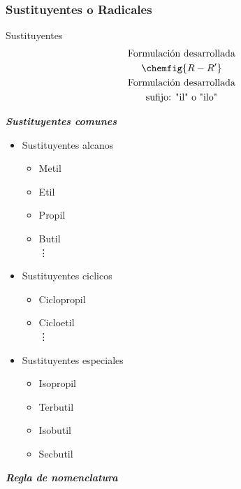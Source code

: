\subsubsection*{Sustituyentes o Radicales}
\begin{Theorem*} {Sustituyentes}
	\begin{gather*}
		\text{Formulación desarrollada} \\
		\chemfig{R-R'} \\
		\text{Formulación desarrollada} \\
		\text{sufijo: "il" o "ilo"}
	\end{gather*}
\end{Theorem*}
\noindent \textbf{\textit{Sustituyentes comunes}}
\begin{itemize}
	\item Sustituyentes alcanos
	\begin{itemize}
		\item Metil \quad {}
		\item Etil \quad {}
		\item Propil \quad {}
		\item Butil \quad {} \\
		\vdots
	\end{itemize}
	\item Sustituyentes ciclicos
	\begin{itemize}
		\item Ciclopropil \quad {}
		\item Cicloetil \quad {}\\
		\vdots
	\end{itemize}
	\item Sustituyentes especiales
	\begin{itemize}
		\item Isopropil \quad {} \\
		\item Terbutil \quad {} \\
		\item Isobutil \quad {} \\
		\item Secbutil \quad {}
	\end{itemize}
\end{itemize}
\noindent \textbf{\textit{Regla de nomenclatura}}
